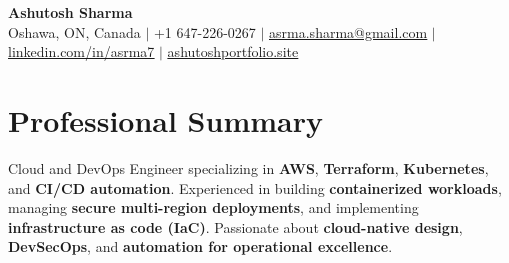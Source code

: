 \documentclass[letterpaper,11pt]{article}
\begin{document}
\begin{center}
    \textbf{\Huge Ashutosh Sharma} \\ \vspace{1pt}
    {Oshawa, ON, Canada} $|$
    \small +1 647-226-0267 $|$ \href{mailto:asrma.sharma@gmail.com}{\underline{asrma.sharma@gmail.com}} $|$
    \href{https://linkedin.com/in/asrma7}{\underline{linkedin.com/in/asrma7}} $|$
    \href{https://ashutoshportfolio.site}{\underline{ashutoshportfolio.site}}
\end{center}

\section*{Professional Summary}
Cloud and DevOps Engineer specializing in \textbf{AWS}, \textbf{Terraform}, \textbf{Kubernetes}, and \textbf{CI/CD automation}. Experienced in building \textbf{containerized workloads}, managing \textbf{secure multi-region deployments}, and implementing \textbf{infrastructure as code (IaC)}. Passionate about \textbf{cloud-native design}, \textbf{DevSecOps}, and \textbf{automation for operational excellence}.

\end{document}
